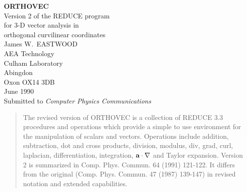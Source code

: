 \setlength{\textheight}{9.0in}
\setlength{\textwidth}{6.5in}
\setlength{\oddsidemargin}{-0.0in}
\setlength{\topmargin}{0.0in}

\begin{center}
{\Large {\bf ORTHOVEC} \\[3ex]
Version 2 of the REDUCE program \\
for 3-D vector analysis in \\ 
orthogonal curvilinear coordinates }\\
\vspace{1.25in}
{\large  James W.~EASTWOOD}\\[2ex]
{\large  AEA Technology}\\
{\large  Culham Laboratory}\\
{\large  Abingdon}\\
{\large  Oxon OX14 3DB}\\[2ex]
{\large  June 1990} \\
\normalsize
\vspace{0.50in}
Submitted to {\em Computer Physics Communications} \\
\end{center}
\vspace{0.75in}

\begin{abstract}
The revised version of ORTHOVEC is a collection of REDUCE 3.3 
procedures and operations which provide a simple to use environment
for the manipulation of scalars and vectors.
Operations include addition, 
subtraction, dot and cross products, division, modulus, div,
grad, curl, laplacian, differentiation, integration, ${\bf a \cdot 
\nabla}$ and Taylor expansion.  Version 2 is summarized in Comp.  Phys.
Commun. 64 (1991) 121-122.  It differs from the original (Comp.  Phys.
Commun. 47 (1987) 139-147) in revised notation and extended capabilities.
\end{abstract}

